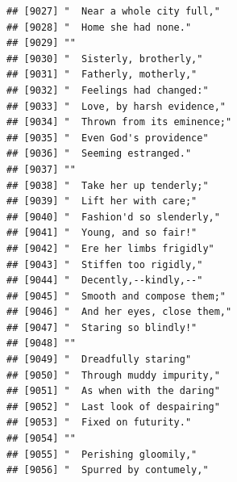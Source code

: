 \documentclass{article}\usepackage[]{graphicx}\usepackage[]{color}
\makeatletter
\newenvironment{kframe}{%
 \def\at@end@of@kframe{}%
 \ifinner\ifhmode%
  \def\at@end@of@kframe{\end{minipage}}%
  \begin{minipage}{\columnwidth}%
 \fi\fi%
 \def\FrameCommand##1{\hskip\@totalleftmargin \hskip-\fboxsep
 \colorbox{shadecolor}{##1}\hskip-\fboxsep
     \hskip-\linewidth \hskip-\@totalleftmargin \hskip\columnwidth}%
 \MakeFramed {\advance\hsize-\width
   \@totalleftmargin\z@ \linewidth\hsize
   \@setminipage}}%
 {\par\unskip\endMakeFramed%
 \at@end@of@kframe}
\newenvironment{knitrout}{}{} %
\makeatother
\begin{document}
\begin{knitrout}
\begin{kframe}
\begin{verbatim}
## [9027] "  Near a whole city full,"                                                   
## [9028] "  Home she had none."                                                        
## [9029] ""                                                                            
## [9030] "  Sisterly, brotherly,"                                                      
## [9031] "  Fatherly, motherly,"                                                       
## [9032] "  Feelings had changed:"                                                     
## [9033] "  Love, by harsh evidence,"                                                  
## [9034] "  Thrown from its eminence;"                                                 
## [9035] "  Even God's providence"                                                     
## [9036] "  Seeming estranged."                                                        
## [9037] ""                                                                            
## [9038] "  Take her up tenderly;"                                                     
## [9039] "  Lift her with care;"                                                       
## [9040] "  Fashion'd so slenderly,"                                                   
## [9041] "  Young, and so fair!"                                                       
## [9042] "  Ere her limbs frigidly"                                                    
## [9043] "  Stiffen too rigidly,"                                                      
## [9044] "  Decently,--kindly,--"                                                      
## [9045] "  Smooth and compose them;"                                                  
## [9046] "  And her eyes, close them,"                                                 
## [9047] "  Staring so blindly!"                                                       
## [9048] ""                                                                            
## [9049] "  Dreadfully staring"                                                        
## [9050] "  Through muddy impurity,"                                                   
## [9051] "  As when with the daring"                                                   
## [9052] "  Last look of despairing"                                                   
## [9053] "  Fixed on futurity."                                                        
## [9054] ""                                                                            
## [9055] "  Perishing gloomily,"                                                       
## [9056] "  Spurred by contumely,"                                                     

\end{verbatim}
\end{kframe}
\end{knitrout}
\end{document}
